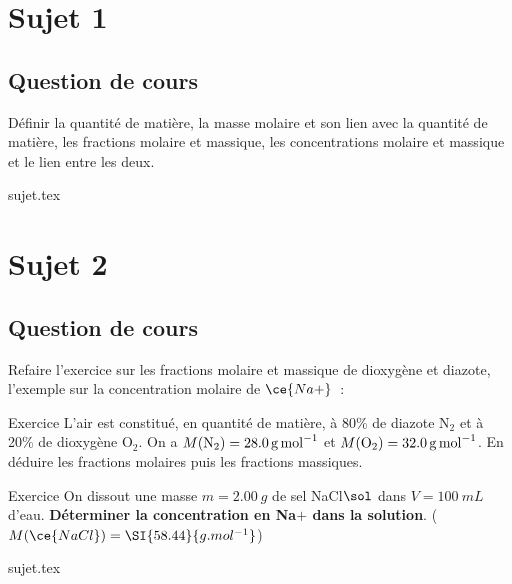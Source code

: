 \documentclass[a4paper, 11pt]{book}
\begin{document}
\resetQ
\newpage

\chapter{Sujet 1}

\section{Question de cours}

Définir la quantité de matière, la masse molaire et son lien avec la quantité de
matière, les fractions molaire et massique, les concentrations molaire et
massique et le lien entre les deux.

{sujet.tex}

\resetQ
\newpage

\chapter{Sujet 2}
\section{Question de cours}

Refaire l'exercice sur les fractions molaire et massique de dioxygène et
diazote, l'exemple sur la concentration molaire de $\ce{Na+}$~:
\begin{tcbraster}[raster columns=2, raster equal height=rows]
    \begin{NCexem}[width=\linewidth]{Exercice}
        L'air est constitué, en quantité de matière, à 80\% de diazote N$_2$ et
        à 20\% de dioxygène O$_2$. On a $M({\rm N_2}) = \SI{28.0}{g.mol^{-1}}$
        et $M({\rm O_2}) = \SI{32.0}{g.mol^{-1}}$. En déduire les fractions
        molaires puis les fractions massiques.
    \end{NCexem}
    \begin{NCexem}[]{Exercice}
        On dissout une masse $m = \SI{2.00}{g}$ de sel NaCl$\sol$ dans $V =
        \SI{100}{mL}$ d'eau. \textbf{Déterminer la concentration en
        Na$\plus{}$ dans la solution}. ($M(\ce{NaCl}) = \SI{58.44}{g.mol^{-1}}$)
    \end{NCexem}
\end{tcbraster}

{sujet.tex}
\end{document}
